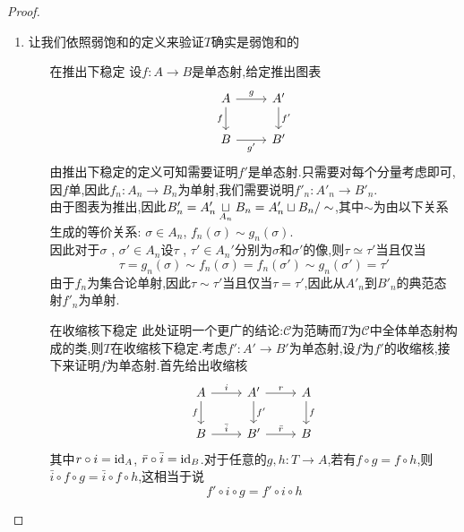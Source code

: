 \begin{proof}
    \begin{enumerate}
        \item 让我们依照弱饱和的定义来验证$T$确实是弱饱和的
        \begin{enumerate}
            \item[在推出下稳定] 设$f: A \to B$是单态射,给定推出图表
            \[\begin{tikzcd}
            	A & {A'} \\
            	B & {B'}
            	\arrow["g", from=1-1, to=1-2]
            	\arrow["f"', from=1-1, to=2-1]
            	\arrow["{f'}", from=1-2, to=2-2]
            	\arrow["{g'}"', from=2-1, to=2-2]
            \end{tikzcd}\]
            由推出下稳定的定义可知需要证明$f'$是单态射.只需要对每个分量考虑即可,因$f$单,因此$f_n : A_n \to B_n$为单射,我们需要说明$f'_n:A'_n \to B'_n$.\\
            由于图表为推出,因此$B_n' = A_n' \underset{A_n}{\sqcup} B_n = A_n' \sqcup B_n /\sim$,其中$\sim$为由以下关系生成的等价关系: $\sigma\in A_n$, $f_n(\sigma)\sim g_n(\sigma)$.\\
            因此对于$\sigma$ , $\sigma'\in A_n$设$\tau$ , $\tau'\in A_n'$分别为$\sigma$和$\sigma'$的像,则$\tau \simeq \tau'$当且仅当
            \[
                \tau = g_n(\sigma) \sim f_n(\sigma) = f_n(\sigma') \sim g_n(\sigma') = \tau'
            \]
            由于$f_n$为集合论单射,因此$\tau \sim \tau'$当且仅当$\tau = \tau'$,因此从$A'_n$到$B'_n$的典范态射$f'_n$为单射.
            \item[在收缩核下稳定] 此处证明一个更广的结论:$\mathcal{C}$为范畴而$T$为$\mathcal{C}$中全体单态射构成的类,则$T$在收缩核下稳定.考虑$f' : A' \to B'$为单态射,设$f$为$f'$的收缩核,接下来证明$f$为单态射.首先给出收缩核
            \[\begin{tikzcd}
	        A & {A'} & A \\
	        B & {B'} & B
	        \arrow["i", from=1-1, to=1-2]
	        \arrow["f"', from=1-1, to=2-1]
	        \arrow["r", from=1-2, to=1-3]
	        \arrow["{f'}", from=1-2, to=2-2]
	        \arrow["f", from=1-3, to=2-3]
	        \arrow["{\bar{i}}", from=2-1, to=2-2]
	        \arrow["{\bar{r}}", from=2-2, to=2-3]
            \end{tikzcd}\]
            其中$r\circ i = \mathrm{id}_A$, $\bar{r}\circ \bar{i} = \mathrm{id}_B$.对于任意的$g,h : T \to A$,若有$f\circ g = f\circ h$,则$\bar{i} \circ f \circ g = \bar{i}\circ f \circ h$,这相当于说
            \[
                f'\circ i \circ g = f'\circ i \circ h
\]
\end{enumerate}
\end{enumerate}
\end{proof}
